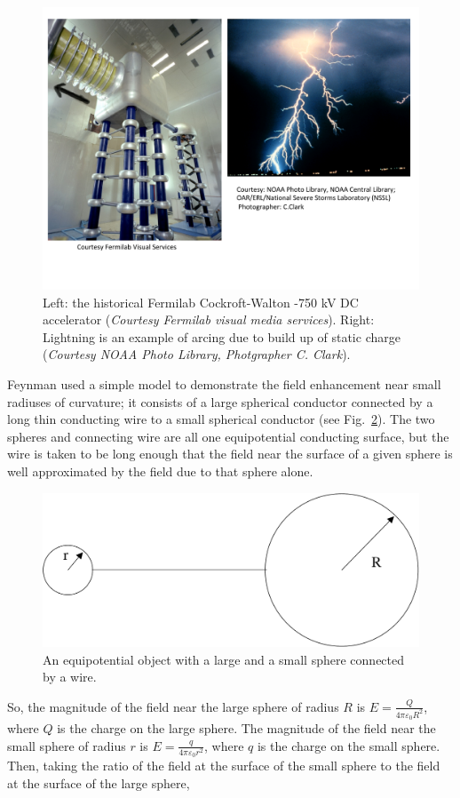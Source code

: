 \documentclass[12pt]{article}
\begin{document}
\begin{flushleft}
\begin{figure}[h]
\centering
\includegraphics*[trim=0cm 2cm 0cm 0cm, clip=true, width=0.7\columnwidth]{cwagain.pdf}
\caption{\small Left: the historical Fermilab Cockroft-Walton -750 kV DC accelerator ({\it Courtesy Fermilab visual media services}).  Right: Lightning is an example of arcing due to build up of static charge ({\it Courtesy NOAA Photo Library, Photgrapher C. Clark}).}
\label{fig:cwagain}
\end{figure}

Feynman used a simple model to demonstrate the field enhancement near small radiuses of curvature; it  consists of a large spherical conductor connected by a long thin conducting wire to a small spherical conductor (see Fig.~\ref{fig:round}).  The two spheres and connecting wire are all one equipotential conducting surface, but the wire is taken to be long enough that the field near the surface of a given sphere is well approximated by the field due to that sphere alone. 

\begin{figure}[h]
\centering
\includegraphics*[trim=0cm 0cm 0cm 0cm, clip=true, width=0.4\columnwidth]{vspheres.pdf}
\caption{\small An equipotential object with a large and a small sphere connected by a wire.}
\label{fig:round}
\end{figure}

So, the magnitude of the field near the large sphere of radius $R$ is $E=\frac{Q}{4\pi\varepsilon_{0}R^{2}}$, where $Q$ is the charge on the large sphere.  The magnitude of the field near the small sphere of radius $r$ is $E=\frac{q}{4\pi\varepsilon_{0}r^{2}}$, where $q$ is the charge on the small sphere.  Then, taking the ratio of the field at the surface of the small sphere to the field at the surface of the large sphere, 


\end{flushleft}
\end{document}
